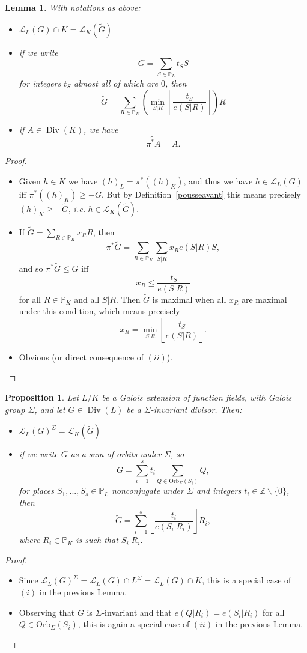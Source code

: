 \documentclass[10pt]{article}
\newtheorem{prop1}[thm]{Proposition}
\newtheorem{lem1}[thm]{Lemma}
\theoremstyle{definition}
\theoremstyle{definition}
\theoremstyle{definition}
\newcommand{\Z}{\mathbb{Z}}
\newcommand{\PP}{\mathbb{P}}
\newcommand{\Div}{\operatorname{Div}}
\newcommand{\calL}{\mathcal{L}}
\begin{document}
\begin{lem1}
With notations as above:
\begin{itemize}
\item[(i)] $\calL_L(G)\cap K = \calL_K(\tilde{G})$
\item[(ii)] if we write
$$G=\sum\limits_{S\in\PP_L}t_SS $$
for integers $t_S$ almost all of which are $0$, then
$$\tilde{G}=\sum\limits_{R\in\PP_K}\left(\min\limits_{S|R}\left\lfloor\dfrac{t_S}{e(S|R)}\right\rfloor\right)R$$
\item[(iii)] if $A \in \Div(K)$, we have \[\widetilde{\pi^*A}=A.\]
\end{itemize}
\end{lem1}
\begin{proof}
\begin{itemize}
\item[$(i)$] Given $h\in K$ we have $(h)_L=\pi^*((h)_K)$, and thus we have $h\in\calL_L(G)$ iff $\pi^*((h)_K)\geq-G$.
But by Definition~\ref{pousseavant} this means precisely $(h)_K\geq-\tilde{G}$, \emph{i.e.} $h\in\calL_K(\tilde{G})$.
\item[$(ii)$] If $\tilde{G}=\sum\limits_{R\in\PP_K}x_RR$, then
$$\pi^*\tilde{G}=\sum\limits_{R\in\PP_K}\sum\limits_{S|R}x_Re(S|R)S,$$
and so $\pi^*\tilde{G}\leq G$ iff $$x_R\leq\dfrac{t_S}{e(S|R)}$$ for all $R\in\PP_K$ and all $S|R$.
Then $\tilde{G}$ is maximal when all $x_R$ are maximal under this condition, which means precisely $$x_R=\min\limits_{S|R}\left\lfloor\dfrac{t_S}{e(S|R)}\right\rfloor.$$
\item[$(iii)$] Obvious (or direct consequence of $(ii)$).
\end{itemize}
\end{proof}


\begin{prop1} \label{invrr}
Let $L/K$ be a Galois extension of function fields, with Galois group $\Sigma$,
and let $G \in \Div(L)$ be a $\Sigma$-invariant divisor. Then:
\begin{itemize}
\item[(i)] $\calL_L(G)^{\Sigma} = \calL_K(\tilde{G})$
\item[(ii)] if we write $G$ as a sum of orbits under $\Sigma$, so
\[G = \sum\limits_{i=1}^s t_i \sum\limits_{Q \in \mathrm{Orb}_{\Sigma}(S_i)} Q,\]
for places $S_1,...,S_s \in \PP_L$ nonconjugate under $\Sigma$ and integers $t_i \in \Z \backslash \{0\}$, then
\[\tilde{G}= \sum\limits_{i=1}^s \left\lfloor\dfrac{t_i}{e(S_i|R_i)}\right\rfloor  R_i ,\]
where $R_i\in\PP_K$ is such that $S_i|R_i$.
\end{itemize}
\end{prop1}
\begin{proof}
\begin{itemize}
\item[$(i)$] Since $\calL_L(G)^{\Sigma}=\calL_L(G)\cap L^\Sigma=\calL_L(G)\cap K$,
this is a special case of $(i)$ in the previous Lemma.
\item[$(ii)$] Observing that $G$ is $\Sigma$-invariant and that $e(Q|R_i)=e(S_i|R_i)$ for all $Q\in\mathrm{Orb}_{\Sigma}(S_i)$, this is again a special case of $(ii)$ in the previous Lemma.
\end{itemize}
\end{proof}
\end{document}
